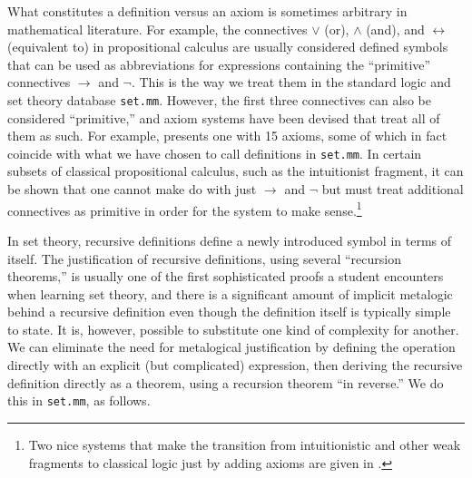What constitutes a definition versus an axiom is sometimes arbitrary in mathematical
literature.  For example, the connectives $\vee$ ({\sc or}), $\wedge$
({\sc and}), and $\leftrightarrow$ (equivalent to) in propositional
calculus are usually considered defined symbols that can be used as
abbreviations for expressions containing the ``primitive'' connectives
$\rightarrow$ and $\neg$.  This is the way we treat them in the standard
logic and set theory database \texttt{set.mm}\index{set theory database
(\texttt{set.mm})}.  However, the first three connectives can also be
considered ``primitive,'' and axiom systems have been devised that treat
all of them as such.  For example,
\cite[p.~35]{Goodstein} presents one with 15
axioms, some of which in fact coincide with what we have chosen to call
definitions in \texttt{set.mm}.  In certain subsets of classical
propositional calculus, such as the intuitionist
fragment, it can be shown that one cannot make do
with just $\rightarrow$ and $\neg$ but must treat additional connectives
as primitive in order for the system to make sense.\footnote{Two nice
systems that make the transition from intuitionistic and other weak
fragments to classical logic just by adding axioms are given in
\cite{Robinsont}.}

In set theory, recursive definitions define a newly introduced symbol in
terms of itself.  The justification of recursive definitions, using
several ``recursion theorems,'' is usually one of the first
sophisticated proofs a student encounters when learning set theory, and
there is a significant amount of implicit metalogic behind a recursive
definition even though the definition itself is typically simple to
state.  It is, however, possible to substitute one kind of complexity
for another.  We can eliminate the need for metalogical justification by
defining the operation directly with an explicit (but complicated)
expression, then deriving the recursive definition directly as a
theorem, using a recursion theorem ``in reverse.''  We do this in
\texttt{set.mm}, as follows.

